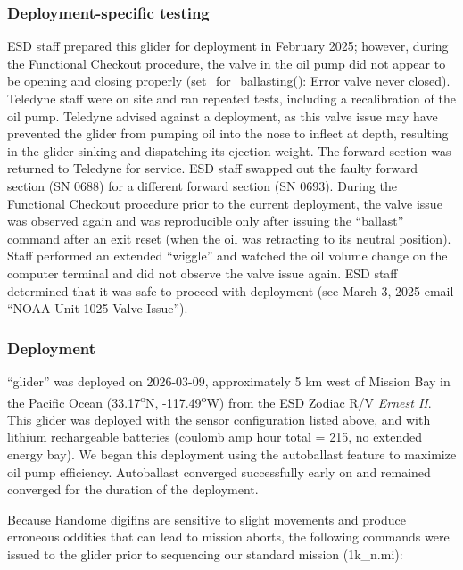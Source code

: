 \documentclass[
  letterpaper,
  DIV=11,
  numbers=noendperiod]{scrartcl}
\begin{document}
\subsubsection{Deployment-specific
testing}\label{deployment-specific-testing}

ESD staff prepared this glider for deployment in February 2025; however,
during the Functional Checkout procedure, the valve in the oil pump did
not appear to be opening and closing properly (set\_for\_ballasting():
Error valve never closed). Teledyne staff were on site and ran repeated
tests, including a recalibration of the oil pump. Teledyne advised
against a deployment, as this valve issue may have prevented the glider
from pumping oil into the nose to inflect at depth, resulting in the
glider sinking and dispatching its ejection weight. The forward section
was returned to Teledyne for service. ESD staff swapped out the faulty
forward section (SN 0688) for a different forward section (SN 0693).
During the Functional Checkout procedure prior to the current
deployment, the valve issue was observed again and was reproducible only
after issuing the ``ballast'' command after an exit reset (when the oil
was retracting to its neutral position). Staff performed an extended
``wiggle'' and watched the oil volume change on the computer terminal
and did not observe the valve issue again. ESD staff determined that it
was safe to proceed with deployment (see March 3, 2025 email ``NOAA Unit
1025 Valve Issue'').

\subsubsection{Deployment}\label{deployment}

``glider'' was deployed on 2026-03-09, approximately 5 km west of
Mission Bay in the Pacific Ocean (33.17\textsuperscript{o}N,
-117.49\textsuperscript{o}W) from the ESD Zodiac R/V \emph{Ernest II}.
This glider was deployed with the sensor configuration listed above, and
with lithium rechargeable batteries (coulomb amp hour total = 215, no
extended energy bay). We began this deployment using the autoballast
feature to maximize oil pump efficiency. Autoballast converged
successfully early on and remained converged for the duration of the
deployment.

Because Randome digifins are sensitive to slight movements and produce
erroneous oddities that can lead to mission aborts, the following
commands were issued to the glider prior to sequencing our standard
mission (1k\_n.mi):
\end{document}
